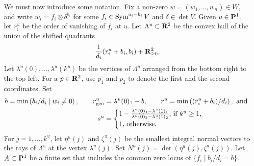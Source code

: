 \documentclass{amsart}
\begin{document}
We must now introduce some notation.
Fix a non-zero \(w = (w_1, \dots, w_n) \in W\), and write \(w_i = f_i \otimes \delta^{b_i}\) for some \(f_i \in \Sym^{a_i-b_i}V\) and \(\delta \in \det V\).
Given \(u \in \P^1\), let \(r_{i}^u\) be the order of vanishing of \(f_i\) at \(u\).
Let \(\Lambda^u \subset \R^2\) be the convex hull of the union of the shifted quadrants
\[ \frac{1}{d_i} (r_i^u+b_i,b_i) + \R_{\geq 0}^2.\]
Let \(\lambda^u(0), \dots, \lambda^u(k^u)\) be the vertices of \(\Lambda^u\) arranged from the bottom right to the top left.
For a \(p \in \R^2\), use \(p_{1}\) and \(p_2\) to denote the first and the second coordinates.
Set
\begin{align*}
  b = \min\left(b_i/d_i \mid w_i \neq 0\right), \qquad r_{\rm gen}^u &= \lambda^u(0)_1 - b, \qquad r^u = \min\left((r_i^u+b_i)/d_i\right), \text{ and } \\
  s^u &= \begin{cases}
    1-\frac{\lambda^u(0)_1 - \lambda^u(1)_1}{\lambda^u(0)_2 - \lambda^u(1)_2} \text{, if \(k^u \geq 1\),} \\
    1 \text{, otherwise}.
    \end{cases}
\end{align*}
For \(j = 1, \dots, k^u\), let \(\eta^u(j)\) and \(\zeta^u(j)\) be the smallest integral normal vectors to the rays of \(\Lambda^u\) at the vertex \(\lambda^u(j)\).
Set \(N^u(j) = \det(\eta^u(j), \zeta^u(j))\).
Let \(A \subset \P^1\) be a finite set that includes the common zero locus of \(\{f_i \mid b_i/d_i = b\}\).
\end{document}
